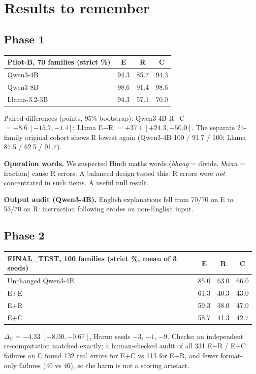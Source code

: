 \documentclass[11pt,a4paper]{article}
\begin{document}
\section{Results to remember}

\subsection{Phase 1}
\begin{center}\small
\begin{tabular}{@{}lccc@{}}\toprule
Pilot-B, 70 families (strict \%) & E & R & C\\\midrule
Qwen3-4B & 94.3 & 85.7 & 94.3\\
Qwen3-8B & 98.6 & 91.4 & 98.6\\
Llama-3.2-3B & 94.3 & 57.1 & 70.0\\\bottomrule
\end{tabular}
\end{center}
Paired differences (points, 95\% bootstrap): Qwen3-4B R$-$C $= -8.6\ [-15.7, -1.4]$; Llama E$-$R $= +37.1\ [+24.3, +50.0]$. The separate 24-family original cohort shows R lowest again (Qwen3-4B 100 / 91.7 / 100; Llama 87.5 / 62.5 / 91.7).

\textbf{Operation words.} We suspected Hindi maths words (\emph{bhaag} = divide, \emph{bhinn} = fraction) cause R errors. A balanced design tested this: R errors were \emph{not} concentrated in such items. A useful null result.

\textbf{Output audit (Qwen3-4B).} English explanations fell from 70/70 on E to 53/70 on R: instruction following erodes on non-English input.

\subsection{Phase 2}
\begin{center}\small
\begin{tabular}{@{}lccc@{}}\toprule
FINAL\_TEST, 100 families (strict \%, mean of 3 seeds) & E & R & C\\\midrule
Unchanged Qwen3-4B & 85.0 & 63.0 & 66.0\\
E+E & 61.3 & 40.3 & 43.0\\
E+R & 59.3 & 38.0 & 47.0\\
E+C & 58.7 & 41.3 & 42.7\\\bottomrule
\end{tabular}
\end{center}
$\Delta_C = -4.33\ [-8.00, -0.67]$, Harm; seeds $-3$, $-1$, $-9$. Checks: an independent re-computation matched exactly; a human-checked audit of all 331 E+R / E+C failures on C found 132 real errors for E+C vs 113 for E+R, and fewer format-only failures (40 vs 46), so the harm is not a scoring artefact.
\end{document}
